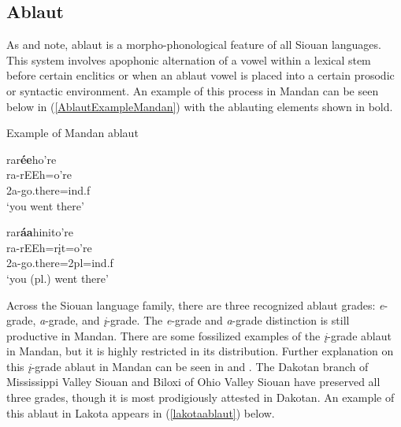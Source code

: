 \subsection{Ablaut}\label{ablaut}

As \citet{rood1983} and \citet{jones1983b} note, ablaut is a morpho-phonological feature of all Siouan languages. This system involves apophonic alternation of a vowel within a lexical stem before certain enclitics or when an ablaut vowel is placed into a certain prosodic or syntactic environment. An example of this process in Mandan can be seen below in (\ref{AblautExampleMandan}) with the ablauting elements shown in bold.



\begin{exe}

\item\label{AblautExampleMandan} Example of Mandan ablaut

	\begin{xlist}

	\item\label{AblautExampleMandana}
	\glll rar\textbf{ée}ho're\\
		ra-rEEh=o're\\
		2a-\textnormal{go.there}=ind.f\\
		\glt `you went there'

	\item\label{AblautExampleMandanb}
	\glll rar\textbf{áa}hinito're\\
		ra-rEEh=rįt=o're\\
		2a-\textnormal{go.there}=2pl=ind.f\\
		\glt `you (pl.) went there'

	\end{xlist}

\end{exe}

Across the Siouan language family, there are three recognized ablaut grades: \textit{e}-grade, \textit{a}-grade, and \textit{į}-grade. The \textit{e}-grade and \textit{a}-grade distinction is still productive in Mandan. There are some fossilized examples of the \textit{į}-grade ablaut in Mandan, but it is highly restricted in its distribution. Further explanation on this \textit{į}-grade ablaut in Mandan can be seen in  and . The Dakotan branch of Mississippi Valley Siouan and Biloxi of Ohio Valley Siouan have preserved all three grades, though it is most prodigiously attested in Dakotan. An example of this ablaut in Lakota appears in (\ref{lakotaablaut}) below.

